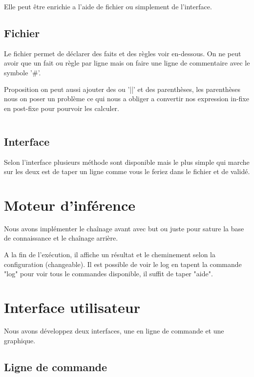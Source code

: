 \documentclass[a4paper, 11pt]{article}
\begin{document}
Elle peut être enrichie a l'aide de fichier ou simplement de l'interface.

\subsection{Fichier}

Le fichier permet de déclarer des faits et des règles voir en-dessous.
On ne peut avoir que un fait ou règle par ligne mais on faire une ligne de commentaire avec le symbole '\#'.

Proposition on peut aussi ajouter des ou '||' et des parenthèses, les parenthèses nous on poser un problème ce qui nous a obliger a convertir nos expression in-fixe en post-fixe pour pourvoir les calculer.  

\inputminted{sql}{../maladies.txt}

\subsection{Interface}

Selon l'interface plusieurs méthode sont disponible mais le plus simple qui marche sur les deux est de taper un ligne comme vous le feriez dans le fichier et de validé.

\section{Moteur d'inférence}

Nous avons implémenter le chaînage avant avec but ou juste pour sature la base de connaissance et le chaînage arrière.

A la fin de l'exécution, il affiche un résultat et le cheminement selon la configuration (changeable). Il est possible de voir le log en tapent la commande "log" pour voir tous le commandes disponible, il suffit de taper "aide".

\section{Interface utilisateur}

Nous avons développez deux interfaces, une en ligne de commande et une graphique. 

\subsection{Ligne de commande}
\end{document}
